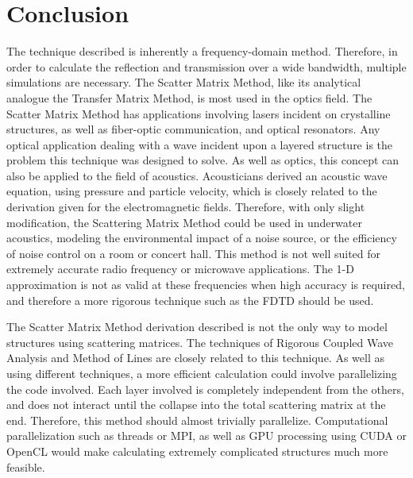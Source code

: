 \section{Conclusion} \label{sec:conclusion}
The technique described is inherently a frequency-domain method.  Therefore, in 
order to calculate the reflection and transmission over a wide bandwidth, 
multiple simulations are necessary.  The Scatter Matrix Method, like its 
analytical analogue the Transfer Matrix Method, is most used in the optics field.  
The Scatter Matrix Method has applications involving lasers incident on 
crystalline structures, as well as fiber-optic communication, and optical 
resonators.  Any optical application dealing with a wave incident upon a layered 
structure is the problem this technique was designed to solve.  As well as optics, 
this concept can also be applied to the field of acoustics.  Acousticians derived 
an acoustic wave equation, using pressure and particle velocity, which is closely 
related to the derivation given for the electromagnetic fields.  Therefore, with 
only slight modification, the Scattering Matrix Method could be used in 
underwater acoustics, modeling the environmental impact of a noise source, or 
the efficiency of noise control on a room or concert hall.  This method is not 
well suited for extremely accurate radio frequency or microwave applications.  
The 1-D approximation is not as valid at these frequencies when high accuracy is 
required, and therefore a more rigorous technique such as the FDTD should be used.  

The Scatter Matrix Method derivation described is not the only way to model 
structures using scattering matrices.  The techniques of Rigorous Coupled Wave 
Analysis and Method of Lines are closely related to this technique.  
As well as using different techniques, a more 
efficient calculation could involve parallelizing the code involved.  Each layer 
involved is completely independent from the others, and does not interact until 
the collapse into the total scattering matrix at the end.  Therefore, this method 
should almost trivially parallelize.  Computational parallelization such as 
threads or MPI, as well as GPU processing using CUDA or OpenCL would make 
calculating extremely complicated structures much more feasible. 


